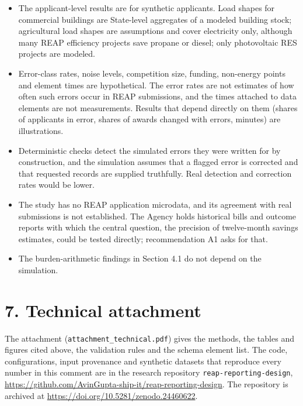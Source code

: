 \documentclass[11pt]{article}
\begin{document}
\begin{itemize}
\item The applicant-level results are for synthetic applicants. Load shapes for
commercial buildings are State-level aggregates of a modeled building stock;
agricultural load shapes are assumptions and cover electricity only, although many REAP
efficiency projects save propane or diesel; only photovoltaic RES projects are modeled.
\item Error-class rates, noise levels, competition size, funding, non-energy points and
element times are hypothetical. The error rates are not estimates of how often such
errors occur in REAP submissions, and the times attached to data elements are not
measurements. Results that depend directly on them (shares of applicants in error, shares
of awards changed with errors, minutes) are illustrations.
\item Deterministic checks detect the simulated errors they were written for by
construction, and the simulation assumes that a flagged error is corrected and that
requested records are supplied truthfully. Real detection and correction rates would be
lower.
\item The study has no REAP application microdata, and its agreement with real
submissions is not established. The Agency holds historical bills and outcome reports
with which the central question, the precision of twelve-month savings estimates, could
be tested directly; recommendation A1 asks for that.
\item The burden-arithmetic findings in Section 4.1 do not depend on the simulation.
\end{itemize}

\section*{7. Technical attachment}

The attachment (\texttt{attachment\_technical.pdf}) gives the methods, the tables and
figures cited above, the validation rules and the schema element list. The code,
configurations, input provenance and synthetic datasets that reproduce every number in
this comment are in the research repository \texttt{reap-reporting-design},
\url{https://github.com/AvinGupta-ship-it/reap-reporting-design}. The repository is archived
at \url{https://doi.org/10.5281/zenodo.24460622}.

{\footnotesize\setlength{\bibsep}{1pt}


}
\end{document}

